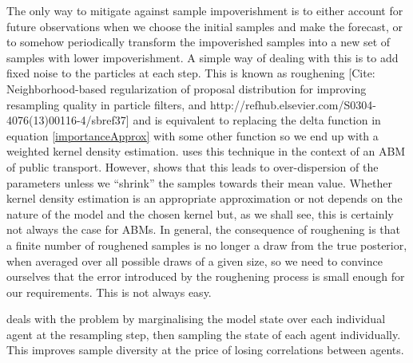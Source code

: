 \documentclass{article}
\begin{document}
The only way to mitigate against sample impoverishment is to either account for future observations when we choose the initial samples and make the forecast, or to somehow periodically transform the impoverished samples into a new set of samples with lower impoverishment. A simple way of dealing with this is to add fixed noise to the particles at each step. This is known as roughening \citep*{gordon1993novel, li2014fight}[Cite: Neighborhood-based regularization of proposal distribution for improving resampling quality in particle filters, and http://refhub.elsevier.com/S0304-4076(13)00116-4/sbref37] and is equivalent to replacing the delta function in equation \eqref{importanceApprox} with some other function so we end up with a weighted kernel density estimation. \citet{kieu_dealing_2020} uses this technique in the context of an ABM of public transport. However, \citet{liu2001combined} shows that this leads to over-dispersion of the parameters unless we ``shrink'' the samples towards their mean value. Whether kernel density estimation is an appropriate approximation or not depends on the nature of the model and the chosen kernel but, as we shall see, this is certainly not always the case for ABMs. In general, the consequence of roughening is that a finite number of roughened samples is no longer a draw from the true posterior, when averaged over all possible draws of a given size, so we need to convince ourselves that the error introduced by the roughening process is small enough for our requirements. This is not always easy.

\citet{wang_data_2015} deals with the problem by marginalising the model state over each individual agent at the resampling step, then sampling the state of each agent individually. This improves sample diversity at the price of losing correlations between agents. 
\end{document}
